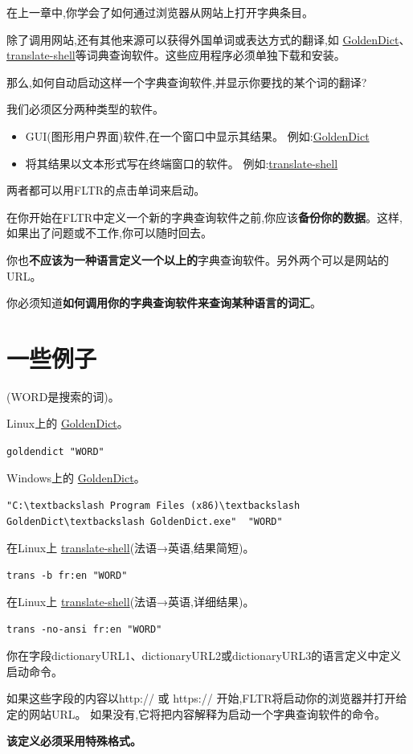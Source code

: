 \documentclass[cn,10pt,math=newtx,citestyle=gb7714-2015,bibstyle=gb7714-2015]{elegantbook}
\newcommand{\goldendict}{\href{http://goldendict.org/}{GoldenDict}}
\newcommand{\translateshell}{\href{https://github.com/soimort/translate-shell}{translate-shell}}
\begin{document}
在上一章中,你学会了如何通过浏览器从网站上打开字典条目。

除了调用网站,还有其他来源可以获得外国单词或表达方式的翻译,如 \goldendict、\translateshell 等词典查询软件。这些应用程序必须单独下载和安装。

那么,如何自动启动这样一个字典查询软件,并显示你要找的某个词的翻译?

我们必须区分两种类型的软件。

\begin{itemize}
    \item  GUI(图形用户界面)软件,在一个窗口中显示其结果。
例如:\goldendict
    \item 将其结果以文本形式写在终端窗口的软件。
例如:\href{https://github.com/soimort/translate-shell}{translate-shell}
\end{itemize}
 
两者都可以用FLTR的点击单词来启动。

在你开始在FLTR中定义一个新的字典查询软件之前,你应该\textbf{备份你的数据}。这样,如果出了问题或不工作,你可以随时回去。

你也\textbf{不应该为一种语言定义一个以上的}字典查询软件。另外两个可以是网站的URL。

你必须知道\textbf{如何调用你的字典查询软件来查询某种语言的词汇}。


\section*{一些例子}(WORD是搜索的词)。

Linux上的 \goldendict。

\lstinline{goldendict "WORD"}

Windows上的 \goldendict。

\lstinline{"C:\textbackslash Program Files (x86)\textbackslash GoldenDict\textbackslash GoldenDict.exe"  "WORD"}

在Linux上 \translateshell (法语→英语,结果简短)。


\lstinline{trans -b fr:en "WORD"}


在Linux上 \translateshell (法语→英语,详细结果)。


\lstinline{trans -no-ansi fr:en "WORD"}


你在字段dictionaryURL1、dictionaryURL2或dictionaryURL3的语言定义中定义启动命令。

如果这些字段的内容以http:// 或 https:// 开始,FLTR将启动你的浏览器并打开给定的网站URL。
如果没有,它将把内容解释为启动一个字典查询软件的命令。

\textbf{该定义必须采用特殊格式。}
\end{document}
